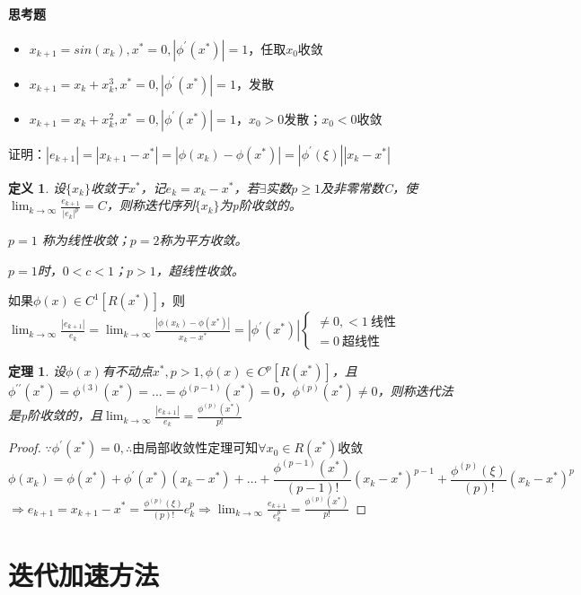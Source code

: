 \documentclass[a4paper]{article}
\newtheorem{definition}{定义}[section]
\newtheorem{theorem}{定理}[section]
\begin{document}
\paragraph{思考题}
\begin{itemize}
    \item $x_{k+1}=sin(x_k), x^*=0, |\phi^{'}(x^*)|=1 $，任取$x_0$收敛
    \item $x_{k+1}=x_k+x_k^3, x^*=0, |\phi^{'}(x^*)|=1 $，发散
    \item $x_{k+1}=x_k+x_k^2, x^*=0, |\phi^{'}(x^*)|=1 $，$x_0>0$发散；$x_0<0$收敛
\end{itemize}
证明：$|e_{k+1} |=|x_{k+1}-x^* |=|\phi(x_k)-\phi(x^*)|=|\phi^{'}(\xi)||x_k-x^*|$

\begin{definition}
    设$\{x_k\}$收敛于$x^*$，记$e_k=x_k-x^*$，若$\exists$实数$p\ge 1$及非零常数C，使$\lim_{k\rightarrow\infty}\frac{e_{k+1}}{|e_k|^p}=C $，则称迭代序列$\{x_k\}$为p阶收敛的。

    $p=1$ 称为线性收敛；$p=2$称为平方收敛。

    $p=1$时，$0<c<1$；$p>1$，超线性收敛。
\end{definition}

如果$\phi(x)\in C^1[R(x^*)]$，则$\lim_{k\rightarrow\infty}\frac{|e_{k+1}|}{e_k}=\lim_{k\rightarrow\infty}\frac{|\phi(x_k)-\phi(x^*)|}{x_k-x^*}=|\phi^{'}(x^*)| \left\{
    \begin{array}{lr}
        \neq 0, <1 \ \text{线性}\\
        =0 \ \text{超线性}
    \end{array}
    \right. $

\begin{theorem}
    设$\phi(x)$有不动点$x^*, p>1,\phi(x)\in C^p[R(x^*)]$，且$\phi^{{'}{'}}(x^*)=\phi^{(3)}(x^*)=\dots = \phi^{(p-1)}(x^*)=0$，$\phi^{(p)}(x^*)\neq 0$，则称迭代法是p阶收敛的，且$\lim_{k\rightarrow\infty}\frac{|e_{k+1}|}{e_k}=\frac{\phi^{(p)}(x^*)}{p!}$
\end{theorem}
\begin{proof}
    $\because \phi^{'}(x^*)=0, \therefore$由局部收敛性定理可知$\forall x_0\in R(x^*) $收敛
    $$\phi(x_k)=\phi(x^*)+\phi^{'}(x^*)(x_k-x^*)+\dots+\frac{\phi^{(p-1)}(x^*)}{(p-1)!}(x_k-x^*)^{p-1}+ \frac{\phi^{(p)}(\xi)}{(p)!}(x_k-x^*)^{p}$$
    $\Rightarrow e_{k+1}=x_{k+1}-x^*= \frac{\phi^{(p)}(\xi)}{(p)!}e^p_k\Rightarrow \lim_{k\rightarrow\infty}\frac{e_{k+1}}{e_k^p}=\frac{\phi^{(p)}(x^*)}{p!}$
\end{proof}

\section{迭代加速方法}
\end{document}

